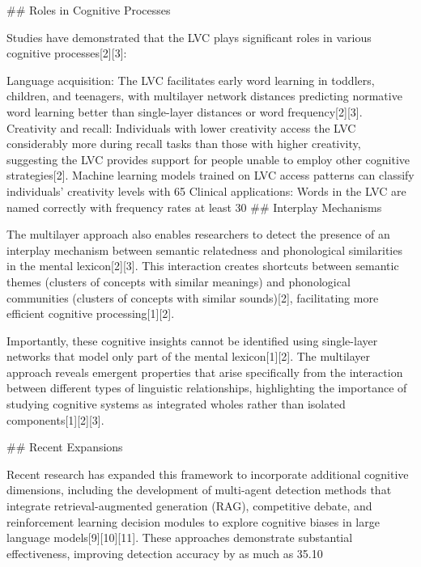 {## Roles in Cognitive Processes

Studies have demonstrated that the LVC plays significant roles in various cognitive processes[2][3]:

Language acquisition: The LVC facilitates early word learning in toddlers, children, and teenagers, with multilayer network distances predicting normative word learning better than single-layer distances or word frequency[2][3].
Creativity and recall: Individuals with lower creativity access the LVC considerably more during recall tasks than those with higher creativity, suggesting the LVC provides support for people unable to employ other cognitive strategies[2]. Machine learning models trained on LVC access patterns can classify individuals’ creativity levels with 65%
Clinical applications: Words in the LVC are named correctly with frequency rates at least 30%
## Interplay Mechanisms

The multilayer approach also enables researchers to detect the presence of an interplay mechanism between semantic relatedness and phonological similarities in the mental lexicon[2][3]. This interaction creates shortcuts between semantic themes (clusters of concepts with similar meanings) and phonological communities (clusters of concepts with similar sounds)[2], facilitating more efficient cognitive processing[1][2].

Importantly, these cognitive insights cannot be identified using single-layer networks that model only part of the mental lexicon[1][2]. The multilayer approach reveals emergent properties that arise specifically from the interaction between different types of linguistic relationships, highlighting the importance of studying cognitive systems as integrated wholes rather than isolated components[1][2][3].

## Recent Expansions

Recent research has expanded this framework to incorporate additional cognitive dimensions, including the development of multi-agent detection methods that integrate retrieval-augmented generation (RAG), competitive debate, and reinforcement learning decision modules to explore cognitive biases in large language models[9][10][11]. These approaches demonstrate substantial effectiveness, improving detection accuracy by as much as 35.10%

}
